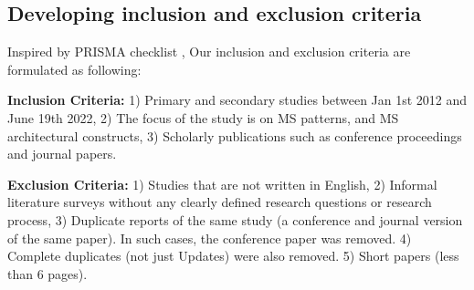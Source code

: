 \documentclass[a4paper,11pt,article,oneside]{memoir}
\begin{document}







    


\subsection{Developing inclusion and exclusion criteria}

Inspired by PRISMA checklist \cite{tricco2018prisma}, Our inclusion and exclusion criteria are formulated as following:

\textbf{Inclusion Criteria:} 1) Primary and secondary studies between Jan 1st 2012 and June 19th 2022, 2) The focus of the study is on MS patterns, and MS architectural constructs, 3) Scholarly publications such as conference proceedings and journal papers.

\textbf{Exclusion Criteria:} 1) Studies that are not written in English, 2) Informal literature surveys without any clearly defined research questions or research process, 3) Duplicate reports of the same study (a conference and journal version of the same paper). In such cases, the conference paper was removed. 4) Complete duplicates (not just Updates) were also removed. 5) Short papers (less than 6 pages).
\end{document}
